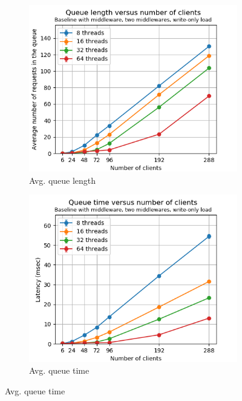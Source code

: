 \documentclass[11pt,a4paper]{article}
\begin{document}
\begin{figure}[h]
\centering
\begin{subfigure}{.33\textwidth}
  \centering
  \includegraphics[width=1.0\linewidth,trim={0px 0px 0px 0px},clip]{img/plot/mwb2-wo-qlen-mini.png}
  \caption{Avg. queue length}
  \label{fig:mwb2-wo-qlen-mini}
\end{subfigure}%
\begin{subfigure}{.33\textwidth}
  \centering
  \includegraphics[width=1.0\linewidth,trim={0px 0px 0px 0px},clip]{img/plot/mwb2-wo-qtime-mini.png}
  \caption{Avg. queue time}
  \label{fig:mwb2-wo-qtime-mini}

\end{subfigure}
\end{figure}
\end{document}
